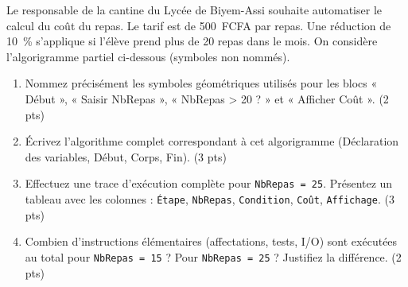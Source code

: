\documentclass[11pt]{article}
\begin{document}
\begin{exercice}
Le responsable de la cantine du Lycée de Biyem-Assi souhaite automatiser le calcul du coût du repas. Le tarif est de \SI{500}{FCFA} par repas. Une réduction de \SI{10}{\%} s'applique si l'élève prend plus de 20 repas dans le mois. On considère l'algorigramme partiel ci-dessous (symboles non nommés).
\begin{center}
\end{center}
\begin{enumerate}
    \item Nommez précisément les symboles géométriques utilisés pour les blocs « Début », « Saisir NbRepas », « NbRepas > 20 ? » et « Afficher Coût ». (2 pts)
    \item Écrivez l'algorithme complet correspondant à cet algorigramme (Déclaration des variables, Début, Corps, Fin). (3 pts)
    \item Effectuez une trace d'exécution complète pour \texttt{NbRepas = 25}. Présentez un tableau avec les colonnes : \texttt{Étape}, \texttt{NbRepas}, \texttt{Condition}, \texttt{Coût}, \texttt{Affichage}. (3 pts)
    \item Combien d'instructions élémentaires (affectations, tests, I/O) sont exécutées au total pour \texttt{NbRepas = 15} ? Pour \texttt{NbRepas = 25} ? Justifiez la différence. (2 pts)
\end{enumerate}
\end{exercice}
\end{document}
